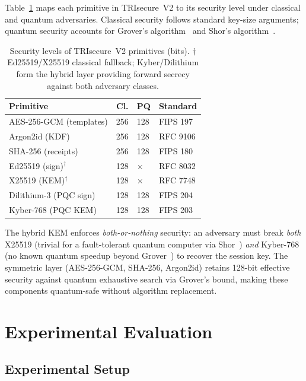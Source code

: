 \documentclass[pdflatex,sn-vancouver-num]{sn-jnl}%
\theoremstyle{thmstyleone}%
\theoremstyle{thmstyletwo}%
\theoremstyle{thmstylethree}%
\begin{document}
Table~\ref{tab:security_levels} maps each primitive in TRIsecure~V2 to its
security level under classical and quantum adversaries. Classical security
follows standard key-size arguments; quantum security accounts for Grover's
algorithm~\cite{grover1996fast} and Shor's algorithm~\cite{shor1994algorithms}.

\begin{table}[t]
\caption{Security levels of TRIsecure~V2 primitives (bits).
  $\dagger$ Ed25519/X25519 classical fallback; Kyber/Dilithium form the
  hybrid layer providing forward secrecy against both adversary classes.}
\label{tab:security_levels}%
\begin{tabular}{|l|c|l|l|}
  \hline
  Primitive & Cl. & PQ & Standard \\
  \hline
  AES-256-GCM (templates) & 256 & 128 & FIPS 197 \\
  Argon2id (KDF)          & 256 & 128 & RFC 9106 \\
  SHA-256 (receipts)      & 256 & 128 & FIPS 180 \\
  Ed25519 (sign)$^\dagger$& 128 & $\times$ & RFC 8032 \\
  X25519 (KEM)$^\dagger$  & 128 & $\times$ & RFC 7748 \\
  Dilithium-3 (PQC sign)  & 128 & 128 & FIPS 204 \\
  Kyber-768 (PQC KEM)     & 128 & 128 & FIPS 203 \\
  \hline
\end{tabular}
\end{table}

The hybrid KEM enforces \emph{both-or-nothing} security: an adversary must
break \emph{both} X25519 (trivial for a fault-tolerant quantum computer via
Shor~\cite{shor1994algorithms}) \emph{and} Kyber-768 (no known quantum
speedup beyond Grover~\cite{grover1996fast}) to recover the session key. The
symmetric layer (AES-256-GCM, SHA-256, Argon2id) retains 128-bit effective
security against quantum exhaustive search via Grover's bound, making these
components quantum-safe without algorithm replacement.

\section{Experimental Evaluation}\label{sec:evaluation}

\subsection{Experimental Setup}
\end{document}
